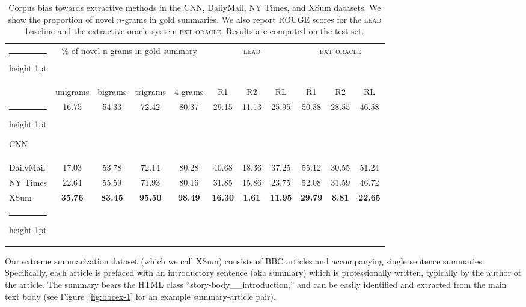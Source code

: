 \documentclass[11pt,a4paper]{article}
\makeatletter
\newcommand{\thickhline}{\noalign {\ifnum 0=`}\fi \hrule height 1pt
    \futurelet \reserved@a \@xhline
}
\makeatother
\begin{document}
\begin{table*}
  \begin{center}{\footnotesize
  \begin{tabular}{ l | c c c c | c c c | c c c } \thickhline
    \multirow{2}{*}{Datasets} & \multicolumn{4}{c|}{\% of novel n-grams in gold summary} & \multicolumn{3}{c|}{\textsc{lead}} & \multicolumn{3}{c}{\textsc{ext-oracle}} \\
    & unigrams & bigrams & trigrams & 4-grams & R1 & R2 & RL & R1 & R2 & RL \\ \thickhline 
    CNN & 16.75 & 54.33 & 72.42 & 80.37 & 29.15 & 11.13 & 25.95 & 50.38 & 28.55 & 46.58 \\
    DailyMail & 17.03 & 53.78 & 72.14 & 80.28 & 40.68 & 18.36 & 37.25 & 55.12 & 30.55 & 51.24 \\
    NY Times & 22.64 & 55.59 & 71.93 & 80.16 & 31.85 & 15.86 & 23.75 & 52.08 & 31.59 & 46.72 \\
    XSum & \textbf{35.76} & \textbf{83.45}  & \textbf{95.50}  & \textbf{98.49}  & \textbf{16.30} & \textbf{1.61}  & \textbf{11.95}  & \textbf{29.79}  & \textbf{8.81}  & \textbf{22.65}  \\ \thickhline
  \end{tabular}}
  \end{center}
  \caption{Corpus bias towards extractive methods in the CNN,
    DailyMail, NY Times, and XSum datasets.  We show  the proportion of novel $n$-grams in gold summaries. We also report ROUGE scores  for
    the  \textsc{lead} baseline and the extractive oracle system
    \textsc{ext-oracle}.     Results
    are computed on the test set.
    \label{table:ngram-coverage-lead-oracle}}
\end{table*}





Our extreme summarization dataset (which we call XSum) consists of BBC
articles and accompanying single sentence summaries. Specifically,
each article is prefaced with an introductory sentence (aka summary)
which is professionally written, typically by the author of the
article. The summary bears the HTML class
``story-body\_\_introduction,'' and can be easily identified and
extracted from the main text body (see Figure~\ref{fig:bbcex-1} for an
example summary-article pair).
\end{document}
